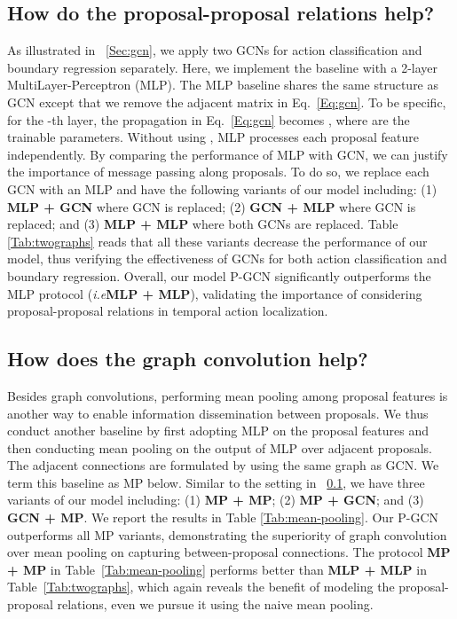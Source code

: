 \documentclass[10pt,twocolumn,letterpaper]{article}
\def\ie{\emph{i.e}\onedot} \def\Ie{\emph{I.e}\onedot}
\begin{document}
	\subsection{How do the proposal-proposal relations help?}
	\label{Sec:5.1}
	As illustrated in \textsection~\ref{Sec:gcn}, we apply two GCNs for action classification and boundary regression separately. 
	Here, we implement the baseline with a 2-layer MultiLayer-Perceptron (MLP). The MLP baseline shares the same structure as GCN except that we remove the adjacent matrix  in Eq.~\eqref{Eq:gcn}. To be specific, for the -th layer, the propagation in Eq.~\eqref{Eq:gcn} becomes , where  are the trainable parameters. 
	Without using , MLP processes each proposal feature independently. By comparing the performance of MLP with GCN, we can justify the importance of message passing along proposals. 
To do so, we replace each GCN with an MLP and have the following variants of our model including: (1) \textbf{MLP + GCN} where GCN is replaced; (2) \textbf{GCN + MLP} where GCN is replaced; and (3) \textbf{MLP + MLP} where both GCNs are replaced.
	Table \ref{Tab:twographs} reads that all these variants decrease the performance of our model, thus verifying the effectiveness of GCNs for both action classification and boundary regression. 
Overall, our model P-GCN significantly outperforms the MLP protocol (\ie \textbf{MLP + MLP}), validating the importance of considering proposal-proposal relations in temporal action localization.
	
	

	
	\subsection{How does the graph convolution help?}
	Besides graph convolutions, performing mean pooling among proposal features is another way to enable information dissemination between proposals. We thus conduct another baseline by first adopting MLP on the proposal features and then conducting mean pooling on the output of MLP over adjacent proposals. The adjacent connections are formulated by using the same graph as GCN. We term this baseline as MP below.
Similar to the setting in \textsection~\ref{Sec:5.1}, we have three variants of our model including: (1) \textbf{MP + MP}; (2) \textbf{MP + GCN}; and (3) \textbf{GCN + MP}. We report the results in Table \ref{Tab:mean-pooling}.  Our P-GCN outperforms all MP variants, demonstrating the superiority of graph convolution over mean pooling on capturing between-proposal connections.
	The protocol \textbf{MP + MP} in Table~\ref{Tab:mean-pooling} performs better than \textbf{MLP + MLP} in Table~\ref{Tab:twographs}, which again reveals the benefit of modeling the proposal-proposal relations, even we pursue it using the naive mean pooling.
	
\end{document}
